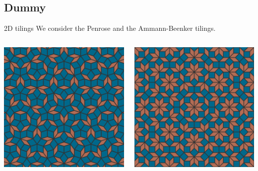 \documentclass[xcolor=x11names,compress,professionalfonts, aspectratio=169]{beamer}
\renewcommand{\(}{\begin{columns}}
\renewcommand{\)}{\end{columns}}
\newcommand{\<}[1]{\begin{column}{#1}}
\renewcommand{\>}{\end{column}}
\begin{document}
\subsection{Dummy}

\begin{frame}{2D tilings}
We consider the Penrose and the Ammann-Beenker tilings.
\begin{columns}
\begin{column}{5cm}
{\centering
\includegraphics[scale=.09]{img/penrose.png}

}
\end{column}
\begin{column}{5cm}
{\centering
\includegraphics[scale=.09]{img/ammann-beenker.png}

}
\end{column}
\end{columns}
\end{frame}
\end{document}
